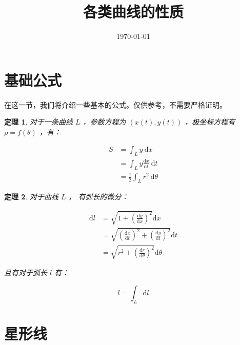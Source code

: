 \documentclass[11pt]{article}
\title{各类曲线的性质}
\author{\Author}
\date{\today}
\newtheorem{theorem}{定理}
\numberwithin{equation}{section}
\numberwithin{theorem}{section}
\begin{document}
\maketitle
\tableofcontents

\section{基础公式}\label{sec:basic-formula}

在这一节，我们将介绍一些基本的公式。仅供参考，不需要严格证明。

\begin{theorem}\label{thm:area-formula}
  对于一条曲线 $L$ ，参数方程为 $(x(t), y(t))$ ，极坐标方程有 $\rho = f(\theta)$ ，有：

  \begin{equation}
    \begin{aligned}
      S &= \int_L y \ \mathrm{d} x \\
      &= \int_L y \frac{\mathrm{d}x}{\mathrm{d}t}\ \mathrm{d}t \\
      &= \frac{1}{2}\int_L r^2\ \mathrm{d}\theta
    \end{aligned}
  \end{equation}

\end{theorem}

\begin{theorem}\label{thm:length-formula}
  对于曲线 $L$ ， 有弧长的微分：

  \begin{equation}
    \begin{aligned}
      \mathrm{d} l &= \sqrt{1 + \left( \frac{\mathrm{d}y}{\mathrm{d}x}\right)^2} \mathrm{d}x \\
      &= \sqrt{\left(\frac{\mathrm{d}x}{\mathrm{d}t}\right)^2
      + \left(\frac{\mathrm{d}y}{\mathrm{d}t}\right)^2} \mathrm{d}t \\
      &= \sqrt{r^2 + \left(\frac{\mathrm{d}r}{\mathrm{d}\theta}\right)^2} \mathrm{d}\theta
    \end{aligned}
  \end{equation}

  且有对于弧长 $l$ 有：

  \begin{equation}
    l = \int_L \mathrm{d}l
  \end{equation}
\end{theorem}

\section{星形线}\label{sec:star-curve}
\end{document}
